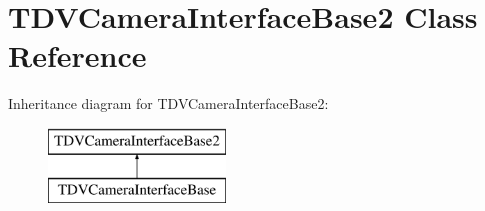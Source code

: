 \hypertarget{classTDVCameraInterfaceBase2}{
\section{TDVCameraInterfaceBase2 Class Reference}
\label{classTDVCameraInterfaceBase2}
}
Inheritance diagram for TDVCameraInterfaceBase2:\begin{figure}[H]
\begin{center}
\leavevmode
\includegraphics[height=2cm]{classTDVCameraInterfaceBase2}
\end{center}
\end{figure}

